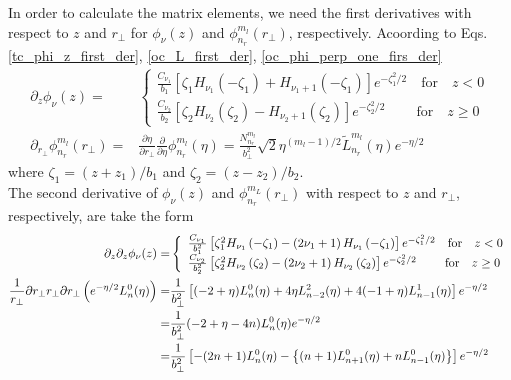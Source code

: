   In order to calculate the matrix elements, we need the first derivatives with respect to $z$ and $r_\perp$ for $\phi_\nu(z)$ and $\phi_{n_r}^{m_l}(r_\perp)$, respectively. Acoording to Eqs.\eqref{tc_phi_z_first_der}, \eqref{oc_L_first_der}, \eqref{oc_phi_perp_one_firs_der}
  \begin{align}
    \partial_{z} \phi_{\nu}(z)=& \left\{\begin{array}{l}
      \frac{C_{\nu_{1}}}{b_{1}}\left[\zeta_{1} H_{\nu_{1}}\left(-\zeta_{1}\right)+H_{\nu_{1}+1}\left(-\zeta_{1}\right)\right] e^{-\zeta_{1}^{2} / 2}  \quad  \text{for} \quad z < 0\\
      \frac{C_{\nu_{2}}}{b_{2}}\left[\zeta_{2} H_{\nu_{2}}\left(\zeta_{2}\right)-H_{\nu_{2}+1}\left(\zeta_{2}\right)\right] e^{-\zeta_{2}^{2} / 2}  \quad \quad ~ \text{for} \quad z \geq 0
    \end{array}\right.  \\
    \partial_{r_{\perp}} \phi_{n_{r}}^{m_{l}}\left(r_{\perp}\right)=&\frac{\partial \eta}{\partial r_{\perp}} \frac{\partial}{\partial \eta} \phi_{n_{r}}^{m_{l}}(\eta)=\frac{N_{n_{r}}^{m_{l}}}{b_{\perp}^{2}} \sqrt{2} \eta^{\left(m_{l}-1\right) / 2} \tilde{L}_{n_{r}}^{m_{l}}(\eta) e^{-\eta / 2}
  \end{align}
  where $\zeta_1 = (z + z_1) / b_1$ and $\zeta_2 = (z - z_2) / b_2$. \\
  The second derivative of $\phi_\nu(z)$ and $\phi_{n_r}^{m_L}(r_\perp)$ with respect to $z$ and $r_\perp$, respectively, are take the form 
  \begin{align}
    \partial_{z} \partial_{z} \phi_{\nu}(z)=&\left\{\begin{array}{l}
      \frac{C_{\nu_{1}}}{b_{1}^{2}}\left[\zeta_{1}^{2} H_{\nu_{1}}\left(-\zeta_{1}\right)-\left(2 \nu_{1}+1\right) H_{\nu_{1}}\left(-\zeta_{1}\right)\right] e^{-\zeta_{1}^{2} / 2}   \quad  \text{for} \quad z < 0\\
      \frac{C_{\nu_{2}}}{b_{2}^{2}}\left[\zeta_{2}^{2} H_{\nu_{2}}\left(\zeta_{2}\right)-\left(2 \nu_{2}+1\right) H_{\nu_{2}}\left(\zeta_{2}\right)\right] e^{-\zeta_{2}^{2} / 2}  \quad  \quad ~ \text{for} \quad z \geq 0
    \end{array}\right.  \\
    \frac{1}{r_{\perp}} \partial r_{\perp} r_{\perp} \partial r_{\perp}\left(e^{-\eta / 2} L_{n}^{0}(\eta)\right) =& \frac{1}{b_{\perp}^{2}}\left[(-2+\eta) L_{n}^{0}(\eta)+4 \eta L_{n-2}^{2}(\eta)+4(-1+\eta) L_{n-1}^{1}(\eta)\right] e^{-\eta / 2} \notag \\
    =&\frac{1}{b_{\perp}^{2}}(-2+\eta-4 n) L_{n}^{0}(\eta) e^{-\eta / 2} \\
    =&\frac{1}{b_{\perp}^{2}}\left[-(2 n+1) L_{n}^{0}(\eta)-\left\{(n+1) L_{n+1}^{0}(\eta)+n L_{n-1}^{0}(\eta)\right\}\right] e^{-\eta / 2} \notag
  \end{align}